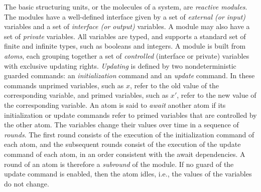 The basic structuring units, or the molecules of a system, are
{\em reactive modules}. The modules have a well-defined interface
given by a set of \emph{external (or input)} variables and a set
of {\em interface (or output)} variables. A module may also have a
set of {\em private} variables. All variables are typed, and
\mocha supports a standard set of finite and infinite types, such
as booleans and integers. A module is built from \emph{atoms},
each grouping together a set of \emph{controlled} (interface or
private) variables with exclusive updating rights. \emph{Updating}
is defined by two nondeterministic guarded commands: an
\emph{initialization} command and an \emph{update} command.  In
these commands unprimed variables, such as $x$, refer to the old
value of the corresponding variable, and primed variables, such as
$x'$, refer to the new value of the corresponding variable.  An
atom is said to \emph{await} another atom if its initialization or
update commands refer to primed variables that are controlled by
the other atom. The variables change their values over time in a
sequence of \emph{rounds}. The first round consists of the
execution of the initialization command of each atom, and the
subsequent rounds consist of the execution of the update command
of each atom,  in an order consistent with the await dependencies.
A round of an atom is therefore a \emph{subround} of the module.
If no guard of the update command is enabled, then the atom idles,
i.e., the values of the variables do not change.  %
%

